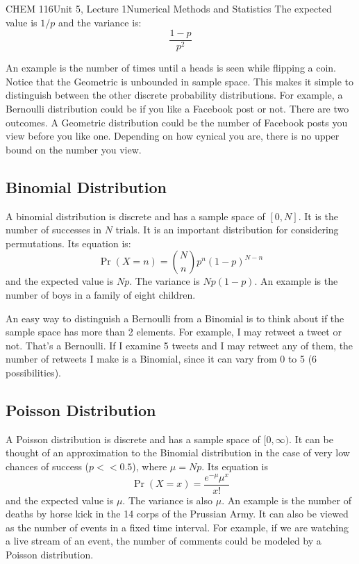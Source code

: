 \documentclass{article}
\begin{document}
\begin{tdoc}{CHEM 116}{Unit 5, Lecture 1}{Numerical Methods and Statistics}
The expected value is $1 / p$ and the variance is:
\begin{equation}
\frac{1 - p}{p^2}
\end{equation}

An example is the number of times until a heads is seen while flipping
a coin. Notice that the Geometric is unbounded in sample space. This
makes it simple to distinguish between the other discrete probability
distributions. For example, a Bernoulli distribution could be if you
like a Facebook post or not. There are two outcomes. A Geometric
distribution could be the number of Facebook posts you view before you
like one. Depending on how cynical you are, there is no upper bound on
the number you view.

\subsection{Binomial Distribution}
A binomial distribution is discrete and has a sample space of
$[0,N]$. It is the number of successes in $N$ trials. It is an
important distribution for considering permutations. Its equation is:
\begin{equation}
\Pr(X=n) =  {N \choose n} p^n(1 - p)^{N - n}
\end{equation}
and the expected value is $Np$. The variance is $Np(1-p)$. An example
is the number of boys in a family of eight children.

An easy way to distinguish a Bernoulli from a Binomial is to think
about if the sample space has more than 2 elements. For example, I may
retweet a tweet or not. That's a Bernoulli. If I examine 5 tweets and
I may retweet any of them, the number of retweets I make is a
Binomial, since it can vary from 0 to 5 (6 possibilities).

\subsection{Poisson Distribution}
A Poisson distribution is discrete and has a sample space of
$[0,\infty)$. It can be thought of an approximation to the Binomial
  distribution in the case of very low chances of success ($p << 0.5$),
  where $\mu = Np$. Its equation is
\begin{equation}
\Pr(X = x) = \frac{e^{-\mu}{\mu^x}}{x!}
\end{equation}
and the expected value is $\mu$. The variance is also $\mu$. An
example is the number of deaths by horse kick in the 14 corps of the
Prussian Army. It can also be viewed as the number of events in a
fixed time interval. For example, if we are watching a live stream of
an event, the number of comments could be modeled by a Poisson
distribution.


\end{tdoc}
\end{document}
